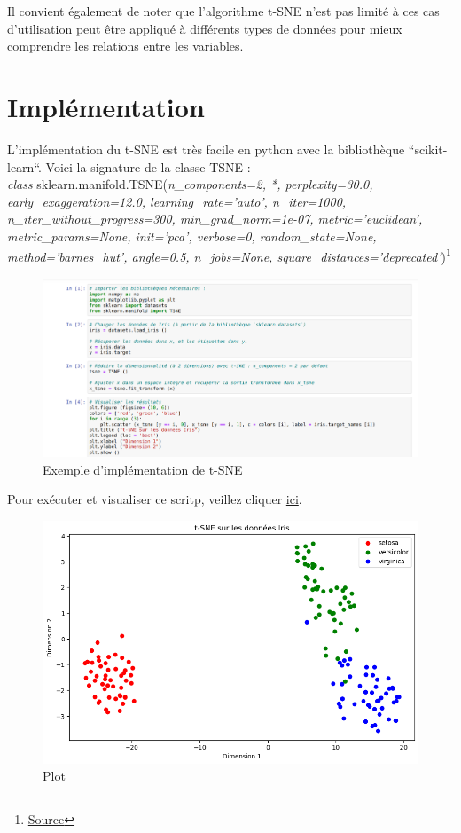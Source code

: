 \documentclass[12pt,a4paper]{article}
\begin{document}
	
	Il convient également de noter que l'algorithme t-SNE n'est pas limité à ces cas d'utilisation peut être appliqué à différents types de données pour mieux comprendre les relations entre les variables.
	
	\newpage
	\section{Implémentation}
	L'implémentation du t-SNE est très facile en python avec la bibliothèque ``scikit-learn``. Voici la signature de la classe TSNE : \\
	\textit{class} sklearn.manifold.TSNE(\textit{n\_components=2, *, perplexity=30.0, early\_exaggeration=12.0, learning\_rate='auto', n\_iter=1000, n\_iter\_without\_progress=300, min\_grad\_norm=1e-07, metric='euclidean', metric\_params=None, init='pca', verbose=0, random\_state=None, method='barnes\_hut', angle=0.5, n\_jobs=None, square\_distances='deprecated'})\footnote{\href{https://scikit-learn.org/stable/modules/generated/sklearn.manifold.TSNE.html}{Source}}
	
	\begin{figure}[H]
		\centering
		\includegraphics[width=\textwidth]{script}
		\caption{Exemple d'implémentation de t-SNE}
		\label{fig:figure1}
	\end{figure}
	
	Pour exécuter et visualiser ce scritp, veillez cliquer \href{https://github.com/hmoustaphaousmane/t-sne/blob/main/t-SNE.ipynb}{ici}.
	
	\begin{figure}[H]
		\centering
		\includegraphics[width= 0.65 \textwidth]{output}
		\caption{Plot}
		\label{fig:figure2}
	\end{figure}
\end{document}
